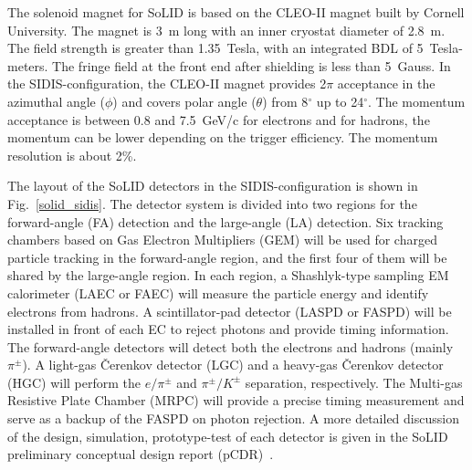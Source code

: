 The solenoid magnet for SoLID is based on the CLEO-II magnet built by
Cornell University. The magnet is 3~m long with an inner cryostat
diameter of 2.8~m. The field strength is greater than
1.35~Tesla, with an integrated BDL of 5~Tesla-meters. The fringe field at the
front end after shielding is less than 5~Gauss. In the SIDIS-configuration, the
CLEO-II magnet provides 2$\pi$ acceptance in the azimuthal angle ($\phi$) and
covers polar angle ($\theta$) from 8$^{\circ}$ up to 24$^{\circ}$. The
momentum acceptance is between 0.8 and 7.5~GeV/c for electrons and for hadrons,
the momentum can be lower depending on the trigger efficiency.  The momentum
resolution is about 2\%.

The layout of the SoLID detectors in the SIDIS-configuration is shown in
Fig.~\ref{solid_sidis}. The detector system is divided into two regions for the
forward-angle (FA) detection and the large-angle (LA) detection. Six tracking
chambers based on Gas Electron Multipliers (GEM) will be used for charged
particle tracking in the forward-angle region, and the first four of them will
be shared by the large-angle
region. In each region, a Shashlyk-type sampling EM calorimeter (LAEC or
FAEC) will measure the particle energy and identify electrons from hadrons. A
scintillator-pad detector (LASPD or FASPD) will be installed in front of each
EC to reject photons and provide timing information. The forward-angle
detectors will detect both the electrons and hadrons (mainly $\pi^{\pm}$). A
light-gas \v{C}erenkov detector (LGC) and a heavy-gas \v{C}erenkov detector
(HGC) will perform the $e/\pi^{\pm}$ and $\pi^{\pm}/K^{\pm}$ separation,
respectively. The Multi-gas Resistive Plate Chamber (MRPC) will provide a
precise timing measurement and serve as a backup of the FASPD on photon
rejection. A more detailed discussion of the design, simulation, prototype-test
of each detector is given in the SoLID preliminary conceptual design report
(pCDR)~\cite{solid_pcdr}.

